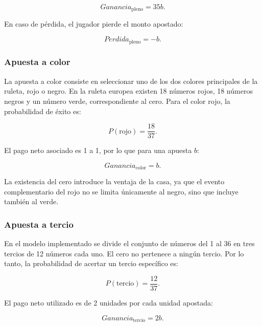 \documentclass{article}
\begin{document}
\begin{equation}
    Ganancia_{\text{pleno}} = 35b.
\end{equation}

En caso de pérdida, el jugador pierde el monto apostado:

\begin{equation}
    Perdida_{\text{pleno}} = -b.
\end{equation}

\subsubsection{Apuesta a color}

La apuesta a color consiste en seleccionar uno de los dos colores principales de la ruleta, rojo o negro. En la ruleta europea existen 18 números rojos, 18 números negros y un número verde, correspondiente al cero. Para el color rojo, la probabilidad de éxito es:

\begin{equation}
    P(\text{rojo})=\frac{18}{37}.
\end{equation}

El pago neto asociado es 1 a 1, por lo que para una apuesta $b$:

\begin{equation}
    Ganancia_{\text{color}} = b.
\end{equation}

La existencia del cero introduce la ventaja de la casa, ya que el evento complementario del rojo no se limita únicamente al negro, sino que incluye también al verde.

\subsubsection{Apuesta a tercio}

En el modelo implementado se divide el conjunto de números del 1 al 36 en tres tercios de 12 números cada uno. El cero no pertenece a ningún tercio. Por lo tanto, la probabilidad de acertar un tercio específico es:

\begin{equation}
    P(\text{tercio})=\frac{12}{37}.
\end{equation}

El pago neto utilizado es de 2 unidades por cada unidad apostada:

\begin{equation}
    Ganancia_{\text{tercio}} = 2b.
\end{equation}
\end{document}
